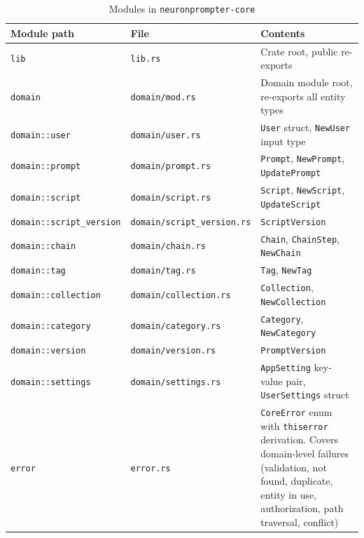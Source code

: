 \documentclass[a4paper, 11pt, oneside]{report}
\begin{document}
\begin{table}[H]
  \centering
  \caption{Modules in \texttt{neuronprompter-core}}
  \label{tab:mod-core}
  \begin{tabularx}{\textwidth}{l l X}
    \toprule
    \textbf{Module path} & \textbf{File} & \textbf{Contents} \\
    \midrule
    \texttt{lib}           & \texttt{lib.rs}       & Crate root, public re-exports \\
    \texttt{domain}        & \texttt{domain/mod.rs}& Domain module root, re-exports all entity types \\
    \texttt{domain::user}  & \texttt{domain/user.rs}      & \texttt{User} struct, \texttt{NewUser} input type \\
    \texttt{domain::prompt}& \texttt{domain/prompt.rs}    & \texttt{Prompt}, \texttt{NewPrompt}, \texttt{UpdatePrompt} \\
    \texttt{domain::script}& \texttt{domain/script.rs}    & \texttt{Script}, \texttt{NewScript}, \texttt{UpdateScript} \\
    \texttt{domain::script\_version} & \texttt{domain/script\_version.rs} & \texttt{ScriptVersion} \\
    \texttt{domain::chain} & \texttt{domain/chain.rs}     & \texttt{Chain}, \texttt{ChainStep}, \texttt{NewChain} \\
    \texttt{domain::tag}   & \texttt{domain/tag.rs}       & \texttt{Tag}, \texttt{NewTag} \\
    \texttt{domain::collection} & \texttt{domain/collection.rs} & \texttt{Collection}, \texttt{NewCollection} \\
    \texttt{domain::category}   & \texttt{domain/category.rs}   & \texttt{Category}, \texttt{NewCategory} \\
    \texttt{domain::version}    & \texttt{domain/version.rs}    & \texttt{PromptVersion} \\
    \texttt{domain::settings}   & \texttt{domain/settings.rs}   & \texttt{AppSetting} key-value pair,
                                                            \texttt{UserSettings} struct \\
    \texttt{error}         & \texttt{error.rs}     & \texttt{CoreError} enum with \texttt{thiserror}
                                                      derivation.  Covers domain-level failures
                                                      (validation, not found, duplicate, entity in use,
                                                      authorization, path traversal, conflict) \\

\end{tabularx}
\end{table}
\end{document}
